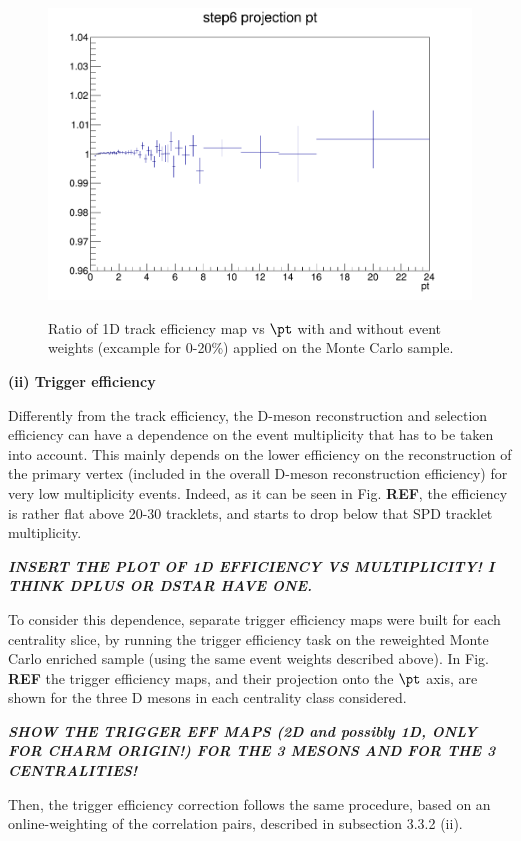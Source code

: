 \begin{figure}
\centering
{\includegraphics[width=0.7\linewidth]{figuresVsCent/Global/CrossCheck_TrackEffWeight.png}}
 \caption{Ratio of 1D track efficiency map vs $\pt$ with and without event weights (excample for 0-20\%) applied on the Monte Carlo sample.}
\label{fig:TrackEFfWeights}
\end{figure}

{\bf (ii) Trigger efficiency}

Differently from the track efficiency, the D-meson reconstruction and selection efficiency can have a dependence on the event multiplicity that has to be taken into account. This mainly depends on the lower efficiency on the reconstruction of the primary vertex (included in the overall D-meson reconstruction efficiency) for very low multiplicity events. Indeed, as it can be seen in Fig. {\bf REF}, the efficiency is rather flat above 20-30 tracklets, and starts to drop below that SPD tracklet multiplicity.

\textit{\textbf{INSERT THE PLOT OF 1D EFFICIENCY VS MULTIPLICITY! I THINK DPLUS OR DSTAR HAVE ONE.}}

To consider this dependence, separate trigger efficiency maps were built for each centrality slice, by running the trigger efficiency task on the reweighted Monte Carlo enriched sample (using the same event weights described above).
In Fig. {\bf REF} the trigger efficiency maps, and their projection onto the $\pt$ axis, are shown for the three D mesons in each centrality class considered.

\textit{\textbf{SHOW THE TRIGGER EFF MAPS (2D and possibly 1D, ONLY FOR CHARM ORIGIN!) FOR THE 3 MESONS AND FOR THE 3 CENTRALITIES!}}

Then, the trigger efficiency correction follows the same procedure, based on an online-weighting of the correlation pairs, described in subsection 3.3.2 (ii).


